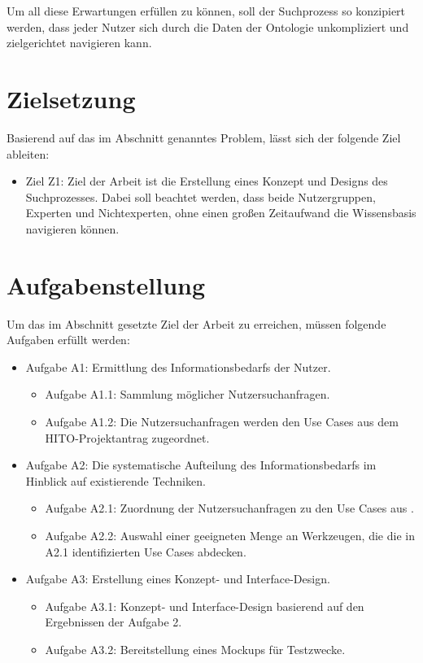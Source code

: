 Um all diese Erwartungen erfüllen zu können, soll der Suchprozess so konzipiert werden, dass jeder Nutzer sich durch die Daten der Ontologie unkompliziert und zielgerichtet navigieren kann.

\section{Zielsetzung}\label{sec:zielsetzung}

Basierend auf das im Abschnitt  genanntes Problem, lässt sich der folgende Ziel ableiten:

\begin{itemize}
\item Ziel Z1: Ziel der Arbeit ist die Erstellung eines Konzept und Designs des Suchprozesses. 
Dabei soll beachtet werden, dass beide Nutzergruppen, Experten und Nichtexperten, ohne einen großen Zeitaufwand die Wissensbasis navigieren können.
\end{itemize}

\section{Aufgabenstellung}\label{sec:aufgabenstellung}

Um das im Abschnitt  gesetzte Ziel der Arbeit zu erreichen, müssen folgende Aufgaben erfüllt werden:

\begin{itemize}
	\item Aufgabe A1: Ermittlung des Informationsbedarfs der Nutzer.
		\begin{itemize}
		\item Aufgabe A1.1: Sammlung möglicher Nutzersuchanfragen.
		\item Aufgabe A1.2: Die Nutzersuchanfragen werden den Use Cases aus dem HITO-Projektantrag zugeordnet.
		\end{itemize}
	\item Aufgabe A2: Die systematische Aufteilung des Informationsbedarfs im Hinblick auf existierende Techniken.
		\begin{itemize}
		\item Aufgabe A2.1: Zuordnung der Nutzersuchanfragen zu den Use Cases aus \citet{linkeddatavisualization}.
		\item Aufgabe A2.2: Auswahl einer geeigneten Menge an Werkzeugen, die die in A2.1 identifizierten Use Cases abdecken.
		\end{itemize}
	\item Aufgabe A3: Erstellung eines Konzept- und Interface-Design.
		\begin{itemize}
		\item Aufgabe A3.1: Konzept- und Interface-Design basierend auf den Ergebnissen der Aufgabe 2.
		\item Aufgabe A3.2: Bereitstellung eines Mockups für Testzwecke.
		\end{itemize}
\end{itemize}

